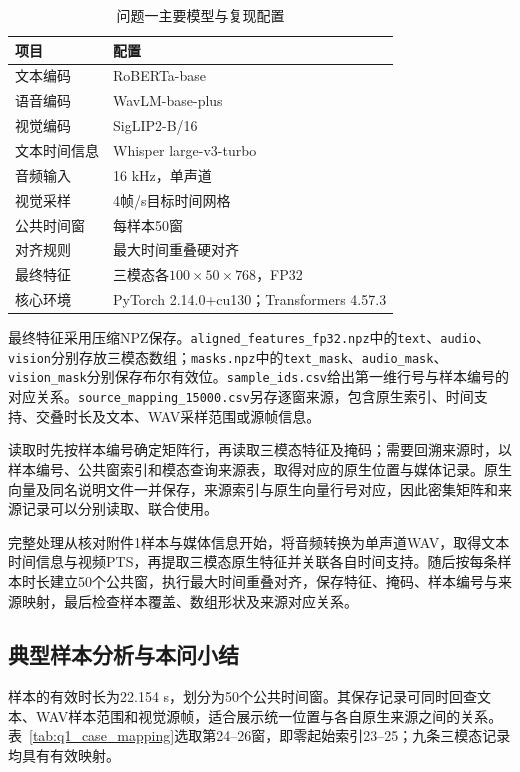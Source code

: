 \begin{table}[H]
\centering
\caption{问题一主要模型与复现配置}\label{tab:q1_repro_models}
\small
\renewcommand{\arraystretch}{1.12}
\begin{tabularx}{\textwidth}{@{}p{3.0cm}X@{}}
\toprule
项目 & 配置 \\
\midrule
文本编码 & RoBERTa-base \\
语音编码 & WavLM-base-plus \\
视觉编码 & SigLIP2-B/16 \\
文本时间信息 & Whisper large-v3-turbo \\
音频输入 & 16 kHz，单声道 \\
视觉采样 & 4帧/s目标时间网格 \\
公共时间窗 & 每样本50窗 \\
对齐规则 & 最大时间重叠硬对齐 \\
最终特征 & 三模态各$100\times50\times768$，FP32 \\
核心环境 & PyTorch 2.14.0+cu130；Transformers 4.57.3 \\
\bottomrule
\end{tabularx}
\end{table}

最终特征采用压缩NPZ保存。\texttt{aligned\_features\_fp32.npz}中的\texttt{text}、\texttt{audio}、\texttt{vision}分别存放三模态数组；\texttt{masks.npz}中的\texttt{text\_mask}、\texttt{audio\_mask}、\texttt{vision\_mask}分别保存布尔有效位。\texttt{sample\_ids.csv}给出第一维行号与样本编号的对应关系。\texttt{source\_mapping\_15000.csv}另存逐窗来源，包含原生索引、时间支持、交叠时长及文本、WAV采样范围或源帧信息。

读取时先按样本编号确定矩阵行，再读取三模态特征及掩码；需要回溯来源时，以样本编号、公共窗索引和模态查询来源表，取得对应的原生位置与媒体记录。原生向量及同名说明文件一并保存，来源索引与原生向量行号对应，因此密集矩阵和来源记录可以分别读取、联合使用。

完整处理从核对附件1样本与媒体信息开始，将音频转换为单声道WAV，取得文本时间信息与视频PTS，再提取三模态原生特征并关联各自时间支持。随后按每条样本时长建立50个公共窗，执行最大时间重叠对齐，保存特征、掩码、样本编号与来源映射，最后检查样本覆盖、数组形状及来源对应关系。
\FloatBarrier

\subsection{典型样本分析与本问小结}\label{subsec:q1_case_summary}
样本\texttt{}的有效时长为22.154 s，划分为50个公共时间窗。其保存记录可同时回查文本、WAV样本范围和视觉源帧，适合展示统一位置与各自原生来源之间的关系。表~\ref{tab:q1_case_mapping}选取第24--26窗，即零起始索引23--25；九条三模态记录均具有有效映射。


